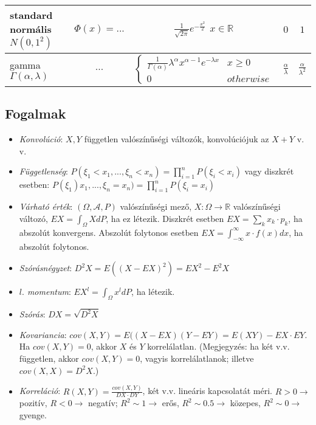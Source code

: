 \documentclass[margin=0px]{article}
\begin{document}
\begin{tabular}{|p{3cm}|c|c|c|c|}
    \hline standard normális \newline $N(0,1^2)$ & $\Phi(x)=...$                              & $\frac{1}{\sqrt{2 \pi}}e^{-\frac{x^2}{2}}$ $x \in \mathbb{R}$                   & $0$           & $1$               \\
    \hline gamma \newline $\Gamma(\alpha,\lambda)$
                                                 & $...$
                                                 & $\left\{\begin{array} {lr}
            \frac{1}{\Gamma(\alpha)}\lambda^{\alpha}x^{\alpha-1}e^{-\lambda x} & x \geq 0  \\
            0                                                                  & otherwise
        \end{array}\right.$
                                                 & $\frac{\alpha}{\lambda}$
                                                 & $\frac{\alpha}{\lambda^2}$                                                                                                                                       \\
    \hline
\end{tabular}

\subsection{Fogalmak}

\begin{itemize}
    \item \textit{Konvolúció}: $X,Y$ független valószínűségi változók, konvolúciójuk az $X+Y$ v. v.
    \item \textit{Függetlenség}: $P(\xi_1<x_1, ..., \xi_n<x_n) = \prod_{i=1}^{n}{P(\xi_i<x_i)}$ vagy diszkrét esetben: $P(\xi_1)x_1, ..., \xi_n=x_n) = \prod_{i=1}^{n}{P(\xi_i=x_i)}$
    \item \textit{Várható érték}: $(\Omega, \mathcal{A}, P)$ valószínűségi mező, $X:\Omega \to \mathbb{R}$ valószínűségi változó, $EX = \int_{\Omega}{XdP}$, ha ez létezik. Diszkrét esetben $EX = \sum_{k}{x_k \cdot p_k}$, ha abszolút konvergens. Abszolút folytonos esetben $EX = \int_{-\infty}^{\infty}{x \cdot f(x)dx}$, ha abszolút folytonos.
    \item \textit{Szórásnégyzet}: $D^{2}X = E((X-EX)^2) = EX^2-E^{2}X$
    \item \textit{$l.$ momentum}: $EX^l = \int_{\Omega}{x^{l}dP}$, ha létezik.
    \item \textit{Szórás}: $DX = \sqrt{D^{2}X}$
    \item \textit{Kovariancia}: $cov(X,Y) = E((X-EX)(Y-EY) = E(XY) - EX \cdot EY$. Ha $cov(X,Y) = 0$, akkor $X$ és $Y$ korrelálatlan. (Megjegyzés: ha két v.v. független, akkor $cov(X,Y) = 0$, vagyis korrelálatlanok; illetve $cov(X,X) = D^{2}X$.)
    \item \textit{Korreláció}: $R(X,Y) = \frac{cov(X,Y)}{DX \cdot DY}$, két v.v. lineáris kapcsolatát méri. $R>0 \to$ pozitív, $R<0 \to$ negatív; $R^2 \sim 1 \to$ erős, $R^2 \sim 0.5 \to$ közepes, $R^2 \sim 0 \to$ gyenge.
\end{itemize}
\end{document}
